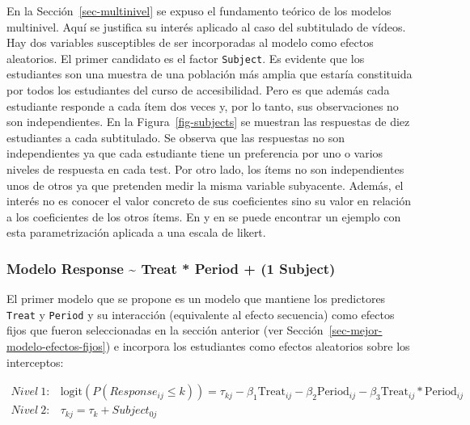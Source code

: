 \documentclass[
  12pt,
  a4paper,
  extrafontsizes,
  onecolumn,
  openright,
  table]{memoir}
\begin{document}
En la Sección~\ref{sec-multinivel} se expuso el fundamento teórico de
los modelos multinivel. Aquí se justifica su interés aplicado al caso
del subtitulado de vídeos. Hay dos variables susceptibles de ser
incorporadas al modelo como efectos aleatorios. El primer candidato es
el factor \texttt{Subject}. Es evidente que los estudiantes son una
muestra de una población más amplia que estaría constituida por todos
los estudiantes del curso de \gls{accesibilidad}. Pero es que además
cada estudiante responde a cada ítem dos veces y, por lo tanto, sus
observaciones no son independientes. En la Figura~\ref{fig-subjects} se
muestran las respuestas de diez estudiantes a cada subtitulado. Se
observa que las respuestas no son independientes ya que cada estudiante
tiene un preferencia por uno o varios niveles de respuesta en cada test.
Por otro lado, los ítems no son independientes unos de otros ya que
pretenden medir la misma variable subyacente. Además, el interés no es
conocer el valor concreto de sus coeficientes sino su valor en relación
a los coeficientes de los otros ítems. En
\textcite[pp.~14-16]{burkner2021} y en \textcite[pp.~19-20]{burkner2019}
se puede encontrar un ejemplo con esta parametrización aplicada a una
\gls{escala de likert}.

\hypertarget{modelo-response-treat-period-1-subject}{%
\subsubsection{Modelo Response \textasciitilde{} Treat * Period + (1
\textbar{} Subject)}\label{modelo-response-treat-period-1-subject}}

El primer modelo que se propone es un modelo que mantiene los
predictores \texttt{Treat} y \texttt{Period} y su interacción
(equivalente al \gls{efecto secuencia}) como efectos fijos que fueron
seleccionadas en la sección anterior (ver
Sección~\ref{sec-mejor-modelo-efectos-fijos}) e incorpora los
estudiantes como efectos aleatorios sobre los interceptos:

\small

\[
\begin{aligned}
Nivel\ 1: & \text{logit}(P(Response_{ij} \leq k)) = \tau_{kj} - \beta_1 \text{Treat}_{ij} - \beta_2 \text{Period}_{ij} - \beta_3 \text{Treat}_{ij} * \text{Period}_{ij} \\
Nivel\ 2: & \tau_{kj}  =  \tau_{k} + Subject_{0j}
\end{aligned}
\]

\normalsize
\end{document}
